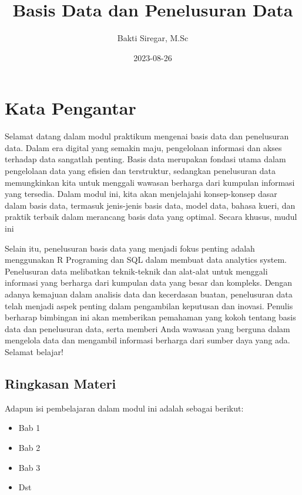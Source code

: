 \documentclass[
]{book}
\title{Basis Data dan Penelusuran Data}
\author{Bakti Siregar, M.Sc}
\date{2023-08-26}
\providecommand{\tightlist}{%
  \setlength{\itemsep}{0pt}\setlength{\parskip}{0pt}}
\begin{document}
\maketitle

{
\setcounter{tocdepth}{1}
\tableofcontents
}
\hypertarget{kata-pengantar}{%
\chapter*{Kata Pengantar}\label{kata-pengantar}}

Selamat datang dalam modul praktikum mengenai basis data dan penelusuran data. Dalam era digital yang semakin maju, pengelolaan informasi dan akses terhadap data sangatlah penting. Basis data merupakan fondasi utama dalam pengelolaan data yang efisien dan terstruktur, sedangkan penelusuran data memungkinkan kita untuk menggali wawasan berharga dari kumpulan informasi yang tersedia. Dalam modul ini, kita akan menjelajahi konsep-konsep dasar dalam basis data, termasuk jenis-jenis basis data, model data, bahasa kueri, dan praktik terbaik dalam merancang basis data yang optimal. Secara khusus, mudul ini

Selain itu, penelusuran basis data yang menjadi fokus penting adalah menggunakan R Programing dan SQL dalam membuat data analytics system. Penelusuran data melibatkan teknik-teknik dan alat-alat untuk menggali informasi yang berharga dari kumpulan data yang besar dan kompleks. Dengan adanya kemajuan dalam analisis data dan kecerdasan buatan, penelusuran data telah menjadi aspek penting dalam pengambilan keputusan dan inovasi. Penulis berharap bimbingan ini akan memberikan pemahaman yang kokoh tentang basis data dan penelusuran data, serta memberi Anda wawasan yang berguna dalam mengelola data dan mengambil informasi berharga dari sumber daya yang ada. Selamat belajar!

\hypertarget{ringkasan-materi}{%
\section*{Ringkasan Materi}\label{ringkasan-materi}}

Adapun isi pembelajaran dalam modul ini adalah sebagai berikut:

\begin{itemize}
\tightlist
\item
  Bab 1
\item
  Bab 2
\item
  Bab 3
\item
  Dst
\end{itemize}
\end{document}
